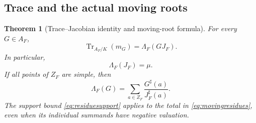 \documentclass[11pt]{article}
\newtheorem{theorem}{Theorem}[section]
\theoremstyle{definition}
\newcommand{\Tr}{\operatorname{Tr}}
\newcommand{\sh}{^{\sharp}}
\begin{document}
\subsection{Trace and the actual moving roots}
\begin{theorem}[Trace--Jacobian identity and moving-root formula]\label{thm:traceresidue}
For every $G\in A_F$,
\begin{equation}\label{eq:traceidentity}
 \Tr_{A_F/K}(m_G)=\Lambda_F(GJ_F).
\end{equation}
In particular,
\begin{equation}\label{eq:residuecount}
 \Lambda_F(J_F)=\mu.
\end{equation}
If all points of $Z_F$ are simple, then
\begin{equation}\label{eq:movingresidues}
 \Lambda_F(G)=\sum_{a\in Z_F}
       \frac{G\sh(a)}{J_F\sh(a)}.
\end{equation}
The support bound \eqref{eq:residuesupport} applies to the total in \eqref{eq:movingresidues}, even when its individual summands have negative valuation.
\end{theorem}
\end{document}
